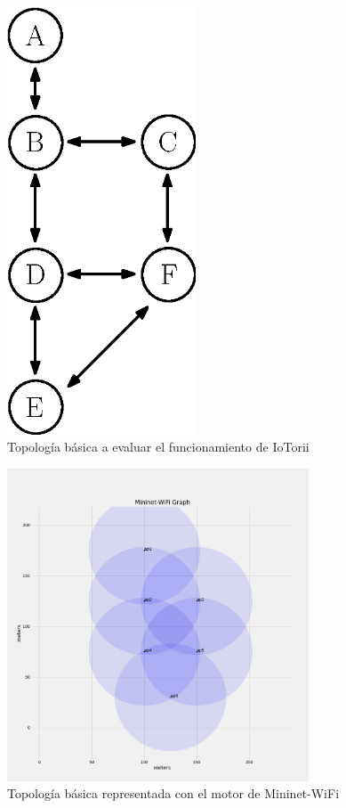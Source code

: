 


\begin{figure}[ht]
    \centering
    \includegraphics[width=0.5\textwidth]{archivos/img/dev/topo_eva.eps}
    \caption{Topología básica a evaluar el funcionamiento de IoTorii}
    \label{fig:topo_eva}
\end{figure}


\begin{figure}[ht]
    \centering
    \includegraphics[width=0.8\textwidth]{archivos/img/dev/topo_val_mininetWifi.png}
    \caption{Topología básica representada con el motor de Mininet-WiFi}
    \label{fig:topo_val_mininetWifi}
\end{figure}


